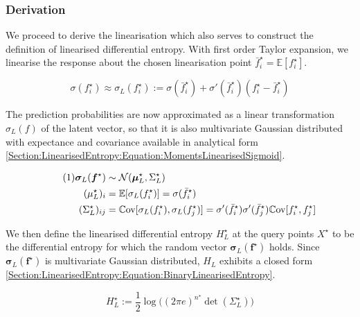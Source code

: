 \documentclass{article}
\renewcommand{\vec}[1]{\boldsymbol{#1}}
\newcommand\numberthis{\addtocounter{equation}{1}\tag{\theequation}}
\begin{document}
		\subsubsection{Derivation}
		
			We proceed to derive the linearisation which also serves to construct the definition of linearised differential entropy. With first order Taylor expansion, we linearise the response about the chosen linearisation point $\bar{f}^{\star}_{i} = \mathbb{E}[f^{\star}_{i}]$.
			
			\begin{equation}
				\sigma(f^{\star}_{i}) \approx \sigma_{L}(f^{\star}_{i}) := \sigma(\bar{f}^{\star}_{i}) + \sigma'(\bar{f}^{\star}_{i}) (f^{\star}_{i} - \bar{f}^{\star}_{i})
			\label{Section:LinearisedEntropy:Equation:LinearisingSigmoid}
			\end{equation}
			
			The prediction probabilities are now approximated as a linear transformation $\sigma_{L}(f)$ of the latent vector, so that it is also multivariate Gaussian distributed with expectance and covariance available in analytical form \eqref{Section:LinearisedEntropy:Equation:MomentsLinearisedSigmoid}.
			
			\begin{align*}
			\numberthis \label{Section:LinearisedEntropy:Equation:MomentsLinearisedSigmoid}
					\vec{\sigma}_{L}(\vec{f}^{\star}) & \sim \mathcal{N}(\vec{\mu}^{\star}_{L}, \Sigma^{\star}_{L}) \\
					({\mu^{\star}_{L}})_{i} & = \mathbb{E}[\sigma_{L}(f^{\star}_{i})] = \sigma(\bar{f}^{\star}_{i}) \\
					({\Sigma^{\star}_{L}})_{ij} & = \mathbb{C}\mathrm{ov}[\sigma_{L}(f^{\star}_{i}), \sigma_{L}(f^{\star}_{j})] = \sigma'(\bar{f}^{\star}_{i}) \sigma'(\bar{f}^{\star}_{j}) \mathbb{C}\mathrm{ov}[f^{\star}_{i}, f^{\star}_{j}]
			\end{align*}
			
			We then define the linearised differential entropy $H^{\star}_{L}$ at the query points $X^{\star}$ to be the differential entropy for which the random vector $\vec{\sigma}_{L}(\vec{f}^{\star})$ holds. Since $\vec{\sigma}_{L}(\vec{f}^{\star})$ is multivariate Gaussian distributed, $H_{L}$ exhibits a closed form \eqref{Section:LinearisedEntropy:Equation:BinaryLinearisedEntropy}.
			
			\begin{equation}
				H^{\star}_{L} := \frac{1}{2} \log\Big((2 \pi e)^{n^{\star}} \det(\Sigma^{\star}_{L})\Big)
			\label{Section:LinearisedEntropy:Equation:BinaryLinearisedEntropy}
			\end{equation}			
					
\end{document}
